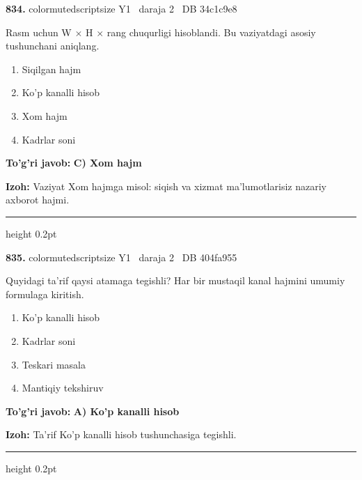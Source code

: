 \documentclass[10pt,a4paper,oneside]{article}
\begin{document}
\noindent\textbf{\color{ink}834.}  {color{muted}scriptsize Y1 \textbullet\ daraja 2 \textbullet\ DB 34c1c9e8}
\par
Rasm uchun W \ensuremath{\times} H \ensuremath{\times} rang chuqurligi hisoblandi. Bu vaziyatdagi asosiy tushunchani aniqlang.
\begin{enumerate}[label=\Alph*),leftmargin=9mm]
\item Siqilgan hajm
\item Ko'p kanalli hisob
\item Xom hajm
\item Kadrlar soni
\end{enumerate}
\begin{tcolorbox}[enhanced,breakable,colback=teal!4,colframe=teal!50!black,boxrule=0.5pt,arc=1.1mm,left=3mm,right=3mm,top=1.7mm,bottom=1.7mm,before skip=2mm,after skip=2mm]
\textbf{\color{teal}To'g'ri javob:} \textbf{C) Xom hajm}
\par\smallskip
\textbf{Izoh:} Vaziyat Xom hajmga misol: siqish va xizmat ma'lumotlarisiz nazariy axborot hajmi.
\end{tcolorbox}
\vspace{2mm}\hrule height 0.2pt \vspace{3mm}

\noindent\textbf{\color{ink}835.}  {color{muted}scriptsize Y1 \textbullet\ daraja 2 \textbullet\ DB 404fa955}
\par
Quyidagi ta'rif qaysi atamaga tegishli? Har bir mustaqil kanal hajmini umumiy formulaga kiritish.
\begin{enumerate}[label=\Alph*),leftmargin=9mm]
\item Ko'p kanalli hisob
\item Kadrlar soni
\item Teskari masala
\item Mantiqiy tekshiruv
\end{enumerate}
\begin{tcolorbox}[enhanced,breakable,colback=teal!4,colframe=teal!50!black,boxrule=0.5pt,arc=1.1mm,left=3mm,right=3mm,top=1.7mm,bottom=1.7mm,before skip=2mm,after skip=2mm]
\textbf{\color{teal}To'g'ri javob:} \textbf{A) Ko'p kanalli hisob}
\par\smallskip
\textbf{Izoh:} Ta'rif Ko'p kanalli hisob tushunchasiga tegishli.
\end{tcolorbox}
\vspace{2mm}\hrule height 0.2pt \vspace{3mm}
\end{document}
